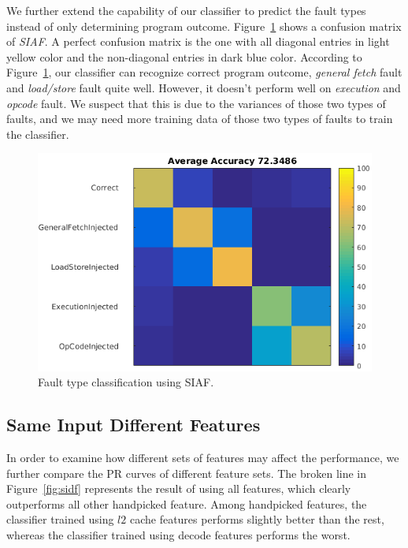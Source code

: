 We further extend the capability of our classifier to predict the fault types instead of only determining program outcome. Figure~\ref{fig:siaf-multi} shows a confusion matrix of \emph{SIAF}. A perfect confusion matrix is the one with all diagonal entries in light yellow color and the non-diagonal entries in dark blue color. According to Figure~\ref{fig:siaf-multi}, our classifier can recognize correct program outcome, \emph{general fetch} fault and \emph{load/store} fault quite well. However, it doesn't perform well on \emph{execution} and \emph{opcode} fault. We suspect that this is due to the variances of those two types of faults, and we may need more training data of those two types of faults to train the classifier.

\begin{figure}[ht]
\begin{center}
   \includegraphics[width=0.8\linewidth]{./figures/siaf_multi.png}
\end{center}
\vspace{-0.3cm}
   \caption{Fault type classification using SIAF.}
\label{fig:siaf-multi}
\vspace{-0.3cm}
\end{figure}

\subsection{Same Input Different Features}
In order to examine how different sets of features may affect the performance, we further compare the PR curves of different feature sets. The broken line in Figure~\ref{fig:sidf} represents the result of using all features, which clearly outperforms all other handpicked feature. Among handpicked features, the classifier trained using $l2$ cache features performs slightly better than the rest, whereas the classifier trained using decode features performs the worst.

